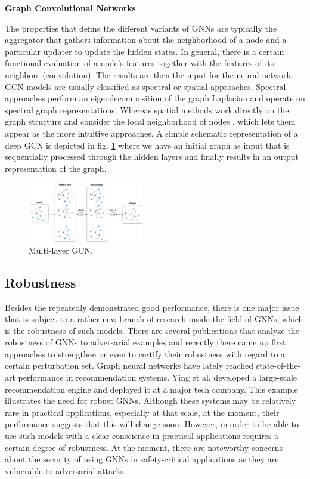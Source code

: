 \documentclass[a4paper,preprint]{sig-alternate}
\begin{document}
\textbf{Graph Convolutional Networks}\newline

The properties that define the different variants of GNNs are typically the aggregator that gathers 
information about the neighborhood of a node and a particular updater to update the hidden states. \cite{Zhou_2019}
In general, there is a certain functional evaluation of a node's features together with the features of its neighbors (convolution). 
The results are then the input for the neural network. GCN models are usually classified as spectral or spatial approaches.
Spectral approaches perform an eigendecomposition of the graph Laplacian and operate on spectral graph representations. \cite{Zhou_2019}
Whereas spatial methods work directly on the graph structure and consider the local neighborhood of nodes \cite{Zhou_2019},
which lets them appear as the more intuitive approaches.
A simple schematic representation of a deep GCN is depicted in fig. \ref{fig:gcn} where we have an initial graph as input
that is sequentially processed through the hidden layers and finally results in an output representation of the graph.
\begin{figure}[h]
    \centering
    \includegraphics[width=0.45\textwidth]{img/gcn.png}
    \caption{Multi-layer GCN. \cite{Kipf_2016}}
    \label{fig:gcn}
\end{figure}

\subsection{Robustness}
\label{subsec:bg2}

Besides the repeatedly demonstrated good performance, there is one major issue that is subject to a rather new branch of 
research inside the field of GNNs, which is the robustness of such models. There are several publications that analyze 
the robustness of GNNs to adversarial examples and recently there came up first approaches to strengthen
or even to certify their robustness with regard to a certain perturbation set.\newline
Graph neural networks have lately reached state-of-the-art performance in recommendation systems. \cite{Ying_2018}
Ying et al. developed a large-scale recommendation engine and deployed it at a major tech company.
This example illustrates the need for robust GNNs. Although these systems may be relatively rare in practical applications, especially at
that scale, at the moment, their performance suggests that this will change soon. However, in order to be able to use such models
with a clear conscience in practical applications requires a certain degree of robustness.
At the moment, there are noteworthy concerns about the security of using GNNs in safety-critical applications as they are
vulnerable to adversarial attacks. \cite{Jin_2020_Graph}\newline
\end{document}
